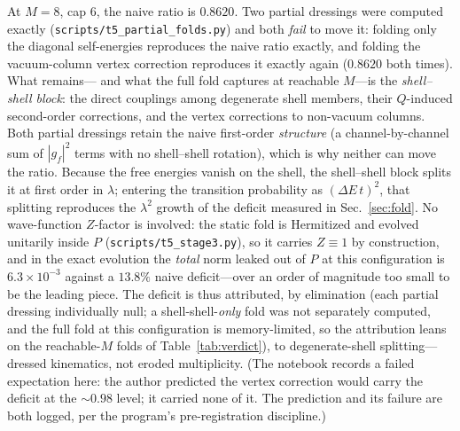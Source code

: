 \documentclass[11pt]{article}
\begin{document}
At $M=8$, cap 6, the naive ratio is $0.8620$. Two partial
dressings were computed exactly
(\texttt{scripts/t5\_partial\_folds.py}) and both \emph{fail} to move it:
folding only the diagonal self-energies reproduces the naive
ratio exactly, and folding the vacuum-column vertex correction
reproduces it exactly again ($0.8620$ both times). What remains---%
and what the full fold captures at reachable $M$---is the
\emph{shell--shell block}: the direct couplings among degenerate shell
members, their $Q$-induced second-order corrections, and the vertex
corrections to non-vacuum columns. Both partial dressings retain the
naive first-order \emph{structure} (a channel-by-channel sum of
$|g_f|^{2}$ terms with no shell--shell rotation), which is why neither
can move the ratio. Because the free energies vanish on the shell, the
shell--shell block splits it at first order in $\lambda$; entering the
transition probability as $(\Delta E\,t)^{2}$, that splitting reproduces
the $\lambda^{2}$ growth of the deficit measured in
Sec.~\ref{sec:fold}. No wave-function $Z$-factor is involved: the static
fold is Hermitized and evolved unitarily inside $P$
(\texttt{scripts/t5\_stage3.py}), so it carries $Z\equiv1$ by
construction, and in the exact evolution the \emph{total} norm leaked
out of $P$ at this configuration is $6.3\times10^{-3}$ against a
$13.8\%$ naive deficit---over an order of magnitude too small to be the
leading piece. The deficit is thus attributed, by elimination
(each partial dressing individually null; a shell-shell-\emph{only} fold was not
separately computed, and the full fold at this
configuration is memory-limited, so the attribution leans on the
reachable-$M$ folds of Table~\ref{tab:verdict}), to degenerate-shell
splitting---dressed kinematics, not eroded multiplicity. (The notebook records a failed expectation here:
the author predicted the vertex correction would carry the
deficit at the ${\sim}0.98$ level; it carried none of it. The
prediction and its failure are both logged, per the program's
pre-registration discipline.)
\end{document}
